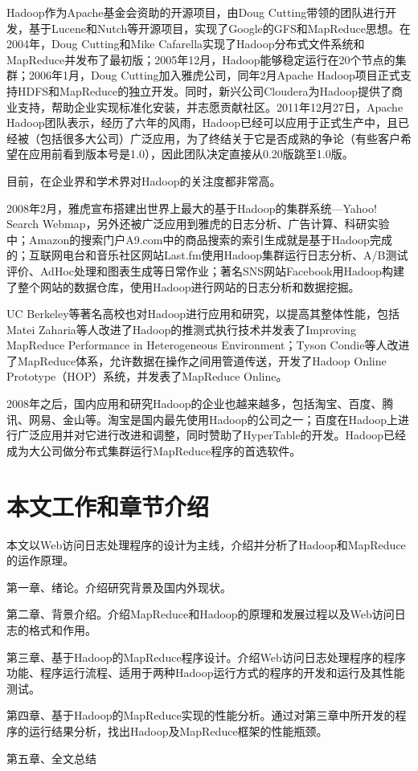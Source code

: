 Hadoop作为Apache基金会资助的开源项目，由Doug Cutting带领的团队进行开发，基于Lucene和Nutch等开源项目，实现了Google的GFS和MapReduce思想。在2004年，Doug Cutting和Mike Cafarella实现了Hadoop分布式文件系统和MapReduce并发布了最初版；2005年12月，Hadoop能够稳定运行在20个节点的集群；2006年1月，Doug Cutting加入雅虎公司，同年2月Apache Hadoop项目正式支持HDFS和MapReduce的独立开发。同时，新兴公司Cloudera为Hadoop提供了商业支持，帮助企业实现标准化安装，并志愿贡献社区。2011年12月27日，Apache Hadoop团队表示，经历了六年的风雨，Hadoop已经可以应用于正式生产中，且已经被（包括很多大公司）广泛应用，为了终结关于它是否成熟的争论（有些客户希望在应用前看到版本号是1.0），因此团队决定直接从0.20版跳至1.0版。

目前，在企业界和学术界对Hadoop的关注度都非常高。

2008年2月，雅虎宣布搭建出世界上最大的基于Hadoop的集群系统—Yahoo! Search Webmap，另外还被广泛应用到雅虎的日志分析、广告计算、科研实验中；Amazon的搜索门户A9.com中的商品搜索的索引生成就是基于Hadoop完成的；互联网电台和音乐社区网站Last.fm使用Hadoop集群运行日志分析、A/B测试评价、AdHoc处理和图表生成等日常作业；著名SNS网站Facebook用Hadoop构建了整个网站的数据仓库，使用Hadoop进行网站的日志分析和数据挖掘。

UC Berkeley等著名高校也对Hadoop进行应用和研究，以提高其整体性能，包括Matei Zaharia等人改进了Hadoop的推测式执行技术并发表了Improving MapReduce Performance in Heterogeneous Environment；Tyson Condie等人改进了MapReduce体系，允许数据在操作之间用管道传送，开发了Hadoop Online Prototype（HOP）系统，并发表了MapReduce Online。

2008年之后，国内应用和研究Hadoop的企业也越来越多，包括淘宝、百度、腾讯、网易、金山等。淘宝是国内最先使用Hadoop的公司之一；百度在Hadoop上进行广泛应用并对它进行改进和调整，同时赞助了HyperTable的开发。Hadoop已经成为大公司做分布式集群运行MapReduce程序的首选软件。


\section{本文工作和章节介绍}
本文以Web访问日志处理程序的设计为主线，介绍并分析了Hadoop和MapReduce的运作原理。

第一章、绪论。介绍研究背景及国内外现状。

第二章、背景介绍。介绍MapReduce和Hadoop的原理和发展过程以及Web访问日志的格式和作用。

第三章、基于Hadoop的MapReduce程序设计。介绍Web访问日志处理程序的程序功能、程序运行流程、适用于两种Hadoop运行方式的程序的开发和运行及其性能测试。

第四章、基于Hadoop的MapReduce实现的性能分析。通过对第三章中所开发的程序的运行结果分析，找出Hadoop及MapReduce框架的性能瓶颈。

第五章、全文总结